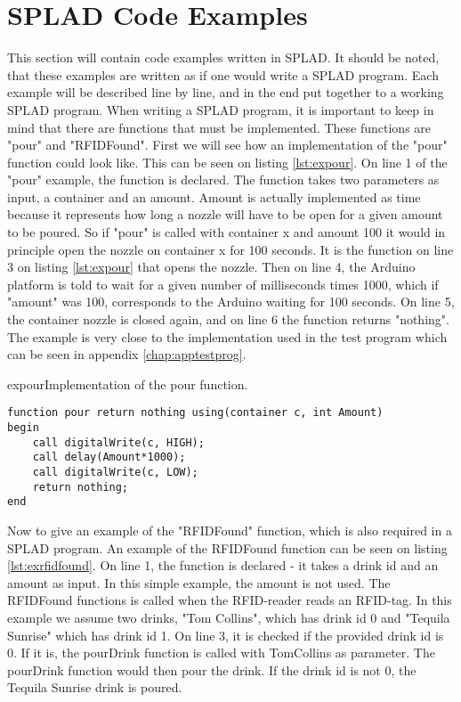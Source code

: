 \section{SPLAD Code Examples}
This section will contain code examples written in SPLAD. It should be noted, that these examples are written as if one would write a SPLAD program. Each example will be described line by line, and in the end put together to a working SPLAD program.
When writing a SPLAD program, it is important to keep in mind that there are functions that must be implemented. These functions are "pour" and "RFIDFound". First we will see how an implementation of the "pour" function could look like. This can be seen on listing \ref{lst:expour}. On line 1 of the "pour" example, the function is declared. The function takes two parameters as input, a container and an amount. Amount is actually implemented as time because it represents how long a nozzle will have to be open for a given amount to be poured. So if "pour" is called with container x and amount 100 it would in principle open the nozzle on container x for 100 seconds. It is the function on line 3 on listing \ref{lst:expour} that opens the nozzle. Then on line 4, the Arduino platform is told to wait for a given number of milliseconds times 1000, which if "amount" was 100, corresponds to the Arduino waiting for 100 seconds. On line 5, the container nozzle is closed again, and on line 6 the function returns "nothing". The example is very close to the implementation used in the test program which can be seen in appendix \ref{chap:apptestprog}.

\begin{code}{expour}{Implementation of the pour function.}
\begin{lstlisting}
function pour return nothing using(container c, int Amount)
begin
	call digitalWrite(c, HIGH);
	call delay(Amount*1000);
	call digitalWrite(c, LOW);
	return nothing;
end
\end{lstlisting}
\end{code}

Now to give an example of the "RFIDFound" function, which is also required in a SPLAD program. An example of the RFIDFound function can be seen on listing \ref{lst:exrfidfound}. On line 1, the function is declared - it takes a drink id and an amount as input. In this simple example, the amount is not used. The RFIDFound functions is called when the RFID-reader reads an RFID-tag. In this example we assume two drinks, "Tom Collins", which has drink id 0 and "Tequila Sunrise" which has drink id 1. On line 3, it is checked if the provided drink id is 0. If it is, the pourDrink function is called with TomCollins as parameter. The pourDrink function would then pour the drink. If the drink id is not 0, the Tequila Sunrise drink is poured.   

